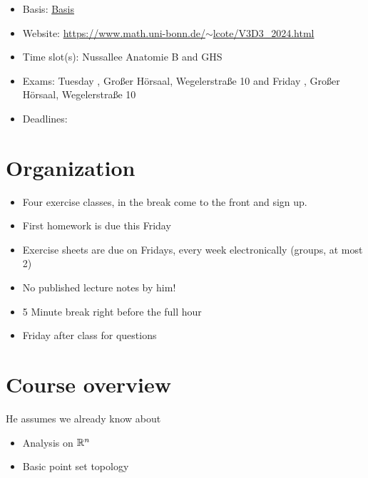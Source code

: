 \begin{tcolorbox}[enhanced,breakable,
	title=General Information,frame style={color=mycolor}]
    \begin{itemize}
        \item Basis: \href{https://basis.uni-bonn.de/qisserver/rds?state=verpublish\&status=init\&vmfile=no&publishid=252386\&moduleCall=webInfo\&publishConfFile=webInfo&publishSubDir=veranstaltung}{Basis}
        \item Website: \href{https://www.math.uni-bonn.de/~lcote/V3D3\_2024.html}{https://www.math.uni-bonn.de/$\sim$lcote/V3D3\_2024.html}
        \item Time slot(s):  Nussallee Anatomie B and  GHS
        \item Exams: Tuesday , Großer Hörsaal, Wegelerstraße 10 and Friday , Großer Hörsaal, Wegelerstraße 10
        \item Deadlines: 
    \end{itemize}
\end{tcolorbox}

\section{Organization}

\begin{itemize}
    \item Four exercise classes, in the break come to the front and sign up. 
    \item First homework is due this Friday 
    \item Exercise sheets are due on Fridays, every week electronically (groups, at most 2)
    \item No published lecture notes by him!
    \item 5 Minute break right before the full hour
    \item Friday after class for questions
\end{itemize}


\section{Course overview}

He assumes we already know about 
\begin{itemize}
    \item Analysis on \(\mathbb{R}^n\)
    \item Basic point set topology
\end{itemize}

